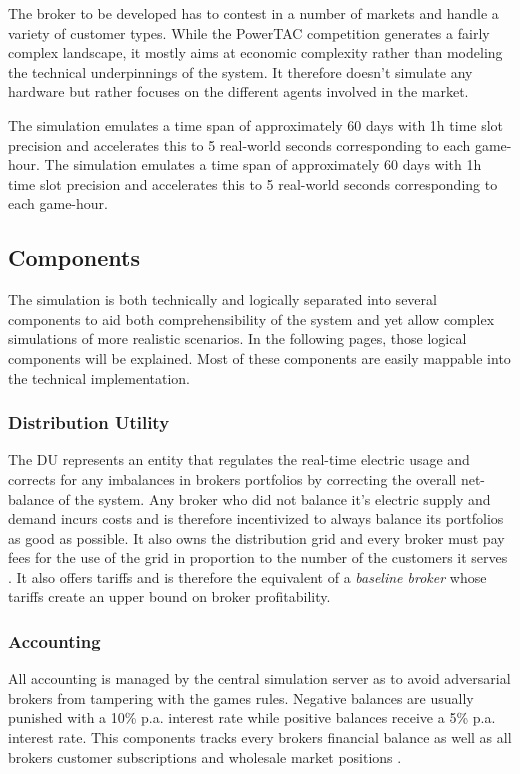 The broker to be developed has to contest in a number of markets and handle a variety of customer types. While the
\ac{PowerTAC} competition generates a fairly complex landscape, it mostly aims at economic complexity rather than
modeling the technical underpinnings of the system. It therefore doesn't simulate any hardware but rather focuses on the
different agents involved in the market.

The simulation emulates a time span of approximately 60 days with 1h time slot precision and accelerates this to 5
real-world seconds corresponding to each game-hour. The simulation emulates a time span of approximately 60 days with 1h
time slot precision and accelerates this to 5 real-world seconds corresponding to each game-hour.

\subsection{Components}

The simulation is both technically and logically separated into several components to aid both comprehensibility of the
system and yet allow complex simulations of more realistic scenarios. In the following pages, those logical components
will be explained. Most of these components are easily mappable into the technical implementation.

\subsubsection{Distribution Utility} The \ac{DU} represents an entity that regulates the real-time electric usage and
corrects for any imbalances in brokers portfolios by correcting the overall net-balance of the system. Any broker who
did not balance it's electric supply and demand incurs costs and is therefore incentivized to always balance its
portfolios as good as possible. It also owns the distribution grid and every broker must pay fees for the use of the
grid in proportion to the number of the customers it serves \citep[p.10]{ketter2018powertac}. It also offers tariffs and
is therefore the equivalent of a \emph{baseline broker} whose tariffs create an upper bound on broker profitability.

\subsubsection{Accounting} All accounting is managed by the central simulation server as to avoid adversarial brokers
from tampering with the games rules. Negative balances are usually punished with a 10\% p.a. interest rate while
positive balances receive a 5\% p.a. interest rate. This components tracks every brokers financial balance as well as
all brokers customer subscriptions and wholesale market positions \citep[p.11]{ketter2018powertac}.

